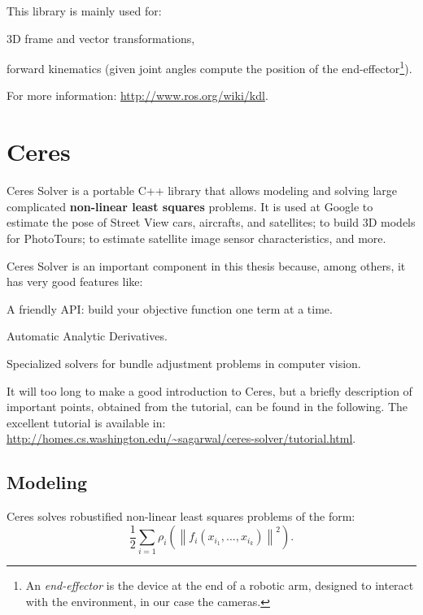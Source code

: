This library is mainly used for:
\begin{itemize*}
 \item 3D frame and vector transformations,
 \item forward kinematics (given joint angles compute the position of the end-effector\footnote{An \textit{end-effector} is the device at the end of a robotic arm, designed to interact with the environment, in our case the cameras.}).
\end{itemize*}


For more information: \url{http://www.ros.org/wiki/kdl}.

\section{Ceres}
\label{sec:Ceres}

Ceres Solver \cite{ceres} is a portable C++ library that allows modeling and solving large complicated \textbf{non-linear least squares} problems. It is used at Google to estimate the pose of Street View cars, aircrafts, and satellites; to build 3D models for PhotoTours; to estimate satellite image sensor characteristics, and more.

Ceres Solver is an important component in this thesis because, among others, it has very good features like:
\begin{itemize*}
\item A friendly API: build your objective function one term at a time.
\item Automatic Analytic Derivatives.
\item Specialized solvers for bundle adjustment problems in computer vision.
\end{itemize*}

It will too long to make a good introduction to Ceres, but a briefly description of important points, obtained from the tutorial, can be found in the following. The excellent tutorial is available in: \url{http://homes.cs.washington.edu/~sagarwal/ceres-solver/tutorial.html}.

\subsection*{Modeling}
Ceres solves robustified non-linear least squares problems of the form:
\[
\frac{1}{2}\sum_{i=1} \rho_i\left(\left\|f_i\left(x_{i_1}, ... ,x_{i_k}\right)\right\|^2\right).
\]

